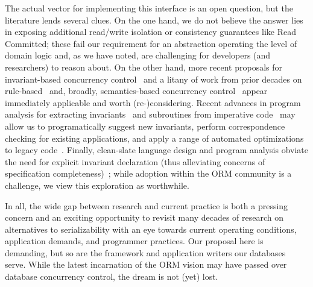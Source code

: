 The actual vector for implementing this interface is an open question,
but the literature lends several clues. On the one hand, we do not
believe the answer lies in exposing additional read/write isolation or
consistency guarantees like Read Committed; these fail our requirement
for an abstraction operating the level of domain logic and, as we have
noted, are challenging for developers (and researchers) to reason
about. On the other hand, more recent proposals for invariant-based
concurrency control~\cite{redblue-new,coord-avoid} and a litany of
work from prior decades on rule-based~\cite{activedb-book} and,
broadly, semantics-based concurrency control~\cite{tamer-book} appear
immediately applicable and worth (re-)considering. Recent advances in
program analysis for extracting invariants~\cite{writes-forest} and
subroutines from imperative code~\cite{statusquo} may allow us to
programatically suggest new invariants, perform correspondence
checking for existing applications, and apply a range of automated
optimizations to legacy code~\cite{pyxis,waves}. Finally, clean-slate language design and
program analysis obviate the need for explicit invariant declaration
(thus alleviating concerns of specification
completeness)~\cite{calm,blazes,hilda}; while adoption within the ORM
community is a challenge, we view this exploration as worthwhile.

In all, the wide gap between research and current practice is both a
pressing concern and an exciting opportunity to revisit many decades of
research on alternatives to serializability with an eye towards
current operating conditions, application demands, and programmer
practices. Our proposal here is demanding, but so are the framework
and application writers our databases serve. While the latest
incarnation of the ORM vision may have passed over database
concurrency control, the dream is not (yet) lost.
